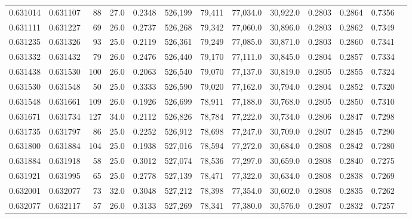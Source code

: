 \begin{tabular}{rrrrrrrrrrrrr}
0.631014 & 0.631107 &    88 & 27.0 &                                     0.2348 & 526,199 &  79,411 &  77,034.0 &  30,922.0 & 0.2803 & 0.2864 & 0.7356 \\
0.631111 & 0.631227 &    69 & 26.0 &                                     0.2737 & 526,268 &  79,342 &  77,060.0 &  30,896.0 & 0.2803 & 0.2862 & 0.7349 \\
0.631235 & 0.631326 &    93 & 25.0 &                                     0.2119 & 526,361 &  79,249 &  77,085.0 &  30,871.0 & 0.2803 & 0.2860 & 0.7341 \\
0.631332 & 0.631432 &    79 & 26.0 &                                     0.2476 & 526,440 &  79,170 &  77,111.0 &  30,845.0 & 0.2804 & 0.2857 & 0.7334 \\
0.631438 & 0.631530 &   100 & 26.0 &                                     0.2063 & 526,540 &  79,070 &  77,137.0 &  30,819.0 & 0.2805 & 0.2855 & 0.7324 \\
0.631530 & 0.631548 &    50 & 25.0 &                                     0.3333 & 526,590 &  79,020 &  77,162.0 &  30,794.0 & 0.2804 & 0.2852 & 0.7320 \\
0.631548 & 0.631661 &   109 & 26.0 &                                     0.1926 & 526,699 &  78,911 &  77,188.0 &  30,768.0 & 0.2805 & 0.2850 & 0.7310 \\
0.631671 & 0.631734 &   127 & 34.0 &                                     0.2112 & 526,826 &  78,784 &  77,222.0 &  30,734.0 & 0.2806 & 0.2847 & 0.7298 \\
0.631735 & 0.631797 &    86 & 25.0 &                                     0.2252 & 526,912 &  78,698 &  77,247.0 &  30,709.0 & 0.2807 & 0.2845 & 0.7290 \\
0.631800 & 0.631884 &   104 & 25.0 &                                     0.1938 & 527,016 &  78,594 &  77,272.0 &  30,684.0 & 0.2808 & 0.2842 & 0.7280 \\
0.631884 & 0.631918 &    58 & 25.0 &                                     0.3012 & 527,074 &  78,536 &  77,297.0 &  30,659.0 & 0.2808 & 0.2840 & 0.7275 \\
0.631921 & 0.631995 &    65 & 25.0 &                                     0.2778 & 527,139 &  78,471 &  77,322.0 &  30,634.0 & 0.2808 & 0.2838 & 0.7269 \\
0.632001 & 0.632077 &    73 & 32.0 &                                     0.3048 & 527,212 &  78,398 &  77,354.0 &  30,602.0 & 0.2808 & 0.2835 & 0.7262 \\
0.632077 & 0.632117 &    57 & 26.0 &                                     0.3133 & 527,269 &  78,341 &  77,380.0 &  30,576.0 & 0.2807 & 0.2832 & 0.7257 \\

\end{tabular}
